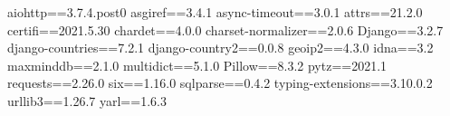 aiohttp==3.7.4.post0
asgiref==3.4.1
async-timeout==3.0.1
attrs==21.2.0
certifi==2021.5.30
chardet==4.0.0
charset-normalizer==2.0.6
Django==3.2.7
django-countries==7.2.1
django-country2==0.0.8
geoip2==4.3.0
idna==3.2
maxminddb==2.1.0
multidict==5.1.0
Pillow==8.3.2
pytz==2021.1
requests==2.26.0
six==1.16.0
sqlparse==0.4.2
typing-extensions==3.10.0.2
urllib3==1.26.7
yarl==1.6.3
